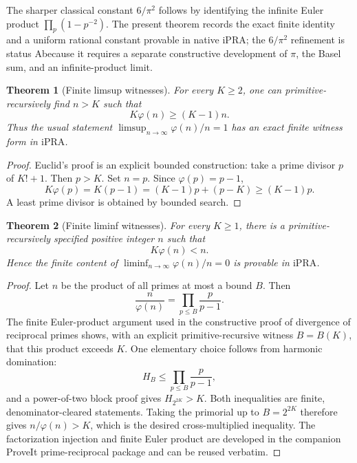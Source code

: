 \documentclass[11pt]{article}
\newtheorem{theorem}{Theorem}[section]
\theoremstyle{definition}
\newcommand{\ipra}{\mathrm{iPRA}}
\newcommand{\StatusA}{\textsf{A}}
\begin{document}
The sharper classical constant \(6/\pi^2\) follows by identifying the infinite
Euler product \(\prod_p(1-p^{-2})\).  The present theorem records the exact
finite identity and a uniform rational constant provable in native \(\ipra\);
the \(6/\pi^2\) refinement is status \StatusA because it requires a separate
constructive development of \(\pi\), the Basel sum, and an infinite-product
limit.

\begin{theorem}[Finite limsup witnesses]\label{thm:limsup-phi}
For every \(K\ge2\), one can primitive-recursively find \(n>K\) such that
\[
 K\varphi(n)\ge(K-1)n.
\]
Thus the usual statement \(\limsup_{n\to\infty}\varphi(n)/n=1\) has an exact
finite witness form in \(\ipra\).
\end{theorem}

\begin{proof}
Euclid's proof is an explicit bounded construction: take a prime divisor
\(p\) of \(K!+1\).  Then \(p>K\).  Set \(n=p\).  Since
\(\varphi(p)=p-1\),
\[
 K\varphi(p)=K(p-1)=(K-1)p+(p-K)\ge(K-1)p.
\]
A least prime divisor is obtained by bounded search.
\end{proof}

\begin{theorem}[Finite liminf witnesses]\label{thm:liminf-phi}
For every \(K\ge1\), there is a primitive-recursively specified positive
integer \(n\) such that
\[
 K\varphi(n)<n.
\]
Hence the finite content of
\(\liminf_{n\to\infty}\varphi(n)/n=0\) is provable in \(\ipra\).
\end{theorem}

\begin{proof}
Let \(n\) be the product of all primes at most a bound \(B\).  Then
\[
 \frac n{\varphi(n)}=\prod_{p\le B}\frac p{p-1}.
\]
The finite Euler-product argument used in the constructive proof of divergence
of reciprocal primes shows, with an explicit primitive-recursive witness
\(B=B(K)\), that this product exceeds \(K\).  One elementary choice follows
from harmonic domination:
\[
 H_B\le\prod_{p\le B}\frac p{p-1},
\]
and a power-of-two block proof gives \(H_{2^{2K}}>K\).  Both inequalities are
finite, denominator-cleared statements.  Taking the primorial up to
\(B=2^{2K}\) therefore gives \(n/\varphi(n)>K\), which is the desired
cross-multiplied inequality.  The factorization injection and finite Euler
product are developed in the companion ProveIt prime-reciprocal package and
can be reused verbatim.
\end{proof}
\end{document}

